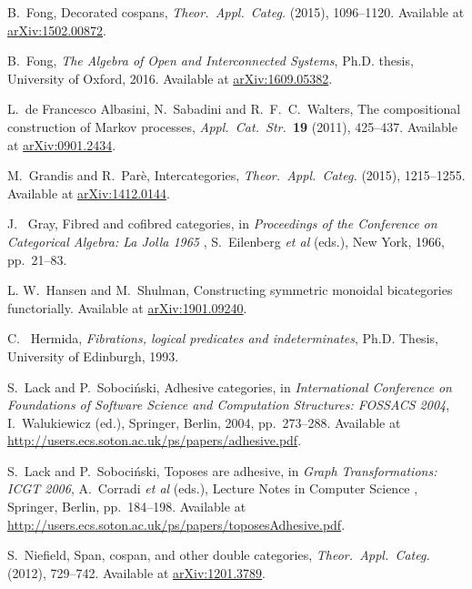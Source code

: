 \documentclass[oneside,final]{ucr}
\theoremstyle{definition}
\newcommand{\define}[1]{{\bf \boldmath #1}}
\begin{document}
{\begin{thebibliography}{1}
 B.\ Fong, Decorated cospans, \textsl{Theor.\ Appl.\ Categ.} 
\define{30} (2015), 1096--1120.   Available at 
\href{http://arxiv.org/abs/1502.00872}{arXiv:1502.00872}.

 B.\ Fong, \textsl{The Algebra of Open and Interconnected Systems}, Ph.D. thesis, University of Oxford, 2016.  Available at \href{https://arxiv.org/abs/1609.05382}{arXiv:1609.05382}.

 L.\ de Francesco Albasini, N.\ Sabadini and R.\ F.\ C.\ Walters, The compositional construction of Markov processes, \textsl{Appl.\ Cat.\ Str.\ }{\bf 19} (2011), 425--437. Available at \href{http://arxiv.org/abs/0901.2434}{arXiv:0901.2434}.

 M.\ Grandis and R.\ Par\`e, Intercategories,  \textsl{Theor.\ Appl.\ Categ.}
\define{30} (2015), 1215--1255. Available at \href{https://arxiv.org/abs/1412.0144}{arXiv:1412.0144}. 

 J. \ Gray, Fibred and cofibred categories, in \textsl{Proceedings of the Conference on Categorical Algebra: La Jolla 1965} , S.\ Eilenberg \textit{et al} (eds.), New York, 1966, pp.\ 21--83.

 L. W.\ Hansen and M.\ Shulman, Constructing symmetric monoidal bicategories functorially. Available at \href{https://arxiv.org/abs/1910.09240}{arXiv:1901.09240}.

 C. \ Hermida, \textsl{Fibrations, logical predicates and indeterminates}, Ph.D. Thesis, University of Edinburgh, 1993.

 S.\ Lack and P.\ Soboci\'nski, Adhesive categories, in \textsl{International Conference on Foundations of Software Science and Computation Structures: FOSSACS 2004}, I.\ Walukiewicz (ed.), Springer, Berlin, 2004, pp.\ 273--288.  Available at \href{http://users.ecs.soton.ac.uk/ps/papers/adhesive.pdf}{http://users.ecs.soton.ac.uk/ps/papers/adhesive.pdf}.

 S.\ Lack and P.\ Soboci\'nski, Toposes are adhesive, in
\textsl{Graph Transformations: ICGT 2006}, A.\ Corradi \textit{et al} (eds.), 
Lecture Notes in Computer Science \define{4178}, Springer, Berlin, pp.\ 184--198.
Available at \href{http://users.ecs.soton.ac.uk/ps/papers/toposesAdhesive.pdf}{http://users.ecs.soton.ac.uk/ps/papers/toposesAdhesive.pdf}.

 S.\ Niefield, Span, cospan, and other double categories, \textsl{Theor.\ Appl.\ Categ.}
\define{26} (2012), 729--742.  Available at \href{https://arxiv.org/abs/1201.3789}{arXiv:1201.3789}.


\end{thebibliography}}
\end{document}
